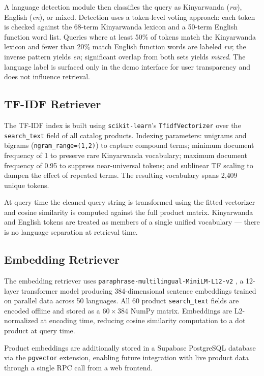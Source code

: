 \documentclass[11pt,a4paper]{article}
\begin{document}
A language detection module then classifies the query as Kinyarwanda
(\textit{rw}), English (\textit{en}), or mixed. Detection uses a
token-level voting approach: each token is checked against the 68-term
Kinyarwanda lexicon and a 50-term English function word list. Queries
where at least 50\% of tokens match the Kinyarwanda lexicon and fewer
than 20\% match English function words are labeled \textit{rw}; the
inverse pattern yields \textit{en}; significant overlap from both sets
yields \textit{mixed}. The language label is surfaced only in the demo
interface for user transparency and does not influence retrieval.

\subsection{TF-IDF Retriever}

The TF-IDF index is built using \texttt{scikit-learn}'s
\texttt{TfidfVectorizer} over the \texttt{search\_text} field of all
catalog products. Indexing parameters: unigrams and bigrams
(\texttt{ngram\_range=(1,2)}) to capture compound terms; minimum document
frequency of 1 to preserve rare Kinyarwanda vocabulary; maximum document
frequency of 0.95 to suppress near-universal tokens; and sublinear TF
scaling to dampen the effect of repeated terms. The resulting vocabulary
spans 2,409 unique tokens.

At query time the cleaned query string is transformed using the fitted
vectorizer and cosine similarity is computed against the full product
matrix. Kinyarwanda and English tokens are treated as members of a single
unified vocabulary — there is no language separation at retrieval time.

\subsection{Embedding Retriever}

The embedding retriever uses
\texttt{paraphrase-multilingual-MiniLM-L12-v2} \citep{reimers2019}, a
12-layer transformer model producing 384-dimensional sentence embeddings
trained on parallel data across 50 languages. All 60 product
\texttt{search\_text} fields are encoded offline and stored as a
$60 \times 384$ NumPy matrix. Embeddings are L2-normalized at encoding
time, reducing cosine similarity computation to a dot product at query
time.

Product embeddings are additionally stored in a Supabase PostgreSQL
database via the \texttt{pgvector} extension, enabling future integration
with live product data through a single RPC call from a web frontend.
\end{document}

